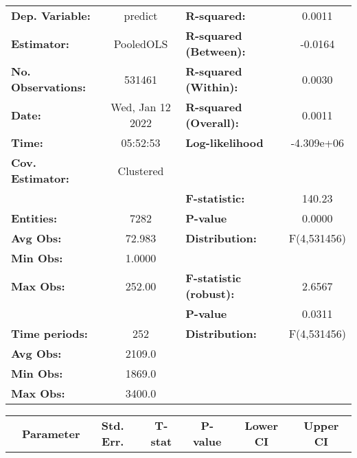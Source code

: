 \begin{center}
\begin{tabular}{lclc}
\toprule
\textbf{Dep. Variable:}    &      predict       & \textbf{  R-squared:         }   &      0.0011      \\
\textbf{Estimator:}        &     PooledOLS      & \textbf{  R-squared (Between):}  &     -0.0164      \\
\textbf{No. Observations:} &       531461       & \textbf{  R-squared (Within):}   &      0.0030      \\
\textbf{Date:}             &  Wed, Jan 12 2022  & \textbf{  R-squared (Overall):}  &      0.0011      \\
\textbf{Time:}             &      05:52:53      & \textbf{  Log-likelihood     }   &    -4.309e+06    \\
\textbf{Cov. Estimator:}   &     Clustered      & \textbf{                     }   &                  \\
\textbf{}                  &                    & \textbf{  F-statistic:       }   &      140.23      \\
\textbf{Entities:}         &        7282        & \textbf{  P-value            }   &      0.0000      \\
\textbf{Avg Obs:}          &       72.983       & \textbf{  Distribution:      }   &   F(4,531456)    \\
\textbf{Min Obs:}          &       1.0000       & \textbf{                     }   &                  \\
\textbf{Max Obs:}          &       252.00       & \textbf{  F-statistic (robust):} &      2.6567      \\
\textbf{}                  &                    & \textbf{  P-value            }   &      0.0311      \\
\textbf{Time periods:}     &        252         & \textbf{  Distribution:      }   &   F(4,531456)    \\
\textbf{Avg Obs:}          &       2109.0       & \textbf{                     }   &                  \\
\textbf{Min Obs:}          &       1869.0       & \textbf{                     }   &                  \\
\textbf{Max Obs:}          &       3400.0       & \textbf{                     }   &                  \\
\bottomrule
\end{tabular}
\begin{tabular}{lcccccc}
                & \textbf{Parameter} & \textbf{Std. Err.} & \textbf{T-stat} & \textbf{P-value} & \textbf{Lower CI} & \textbf{Upper CI}  \\

\end{tabular}
\end{center}
